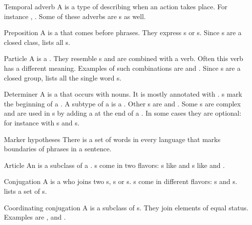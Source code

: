 \begin{df}{Temporal adverb}
A \sb{} is a type of  describing when an action takes place. For instance , . Some of these adverbs are s as well.
\end{df}
\begin{df}{Preposition}
A \sb{} is a  that comes before  phrases. They express s or s. Since \sb{}s are a closed class,  lists all \sb{}s.
\end{df}
\begin{df}{Particle}
A \sb{} is a . They resemble s and are combined with a verb. Often this verb has a different meaning. Examples of such combinations are  and . Since \sb{}s are a closed group,  lists all the single word \sb{}s.
\end{df}
\begin{df}[Det]{Determiner}
A \sb{} is a  that occurs with nouns. It is mostly annotated with . \sb{}s mark the beginning of a . A subtype of a \sb{} is a . Other \sb{}s are  and . Some \sb{}s are complex and are used in s by adding a  at the end of a . In some cases they are optional: for instance with s and s.
\end{df}
\begin{tm}{Marker hypotheses}
There is a set of words in every language that marks boundaries of phrases in a sentence.
\end{tm}
\begin{df}{Article}
An \sb{} is a subclass of a . \sb{}s come in two flavors: s like  and s like  and .
\end{df}
\begin{df}{Conjugation}
A \sb{} is a  who joins two s, s or s. \sb{}s come in different flavors: s and s.  lists a set of \sb{}s.
\end{df}
\begin{df}{Coordinating conjugation}
A \sb{} is a subclass of s. They join elements of equal status. Examples are ,  and .
\end{df}
